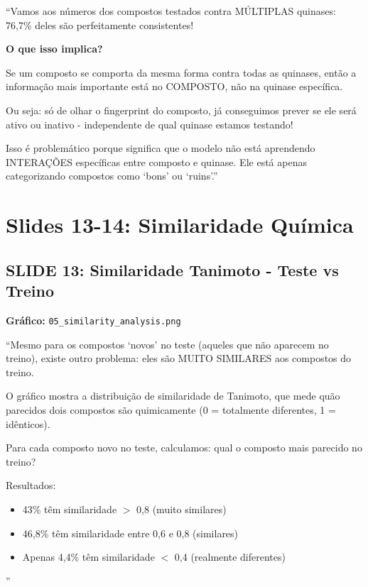 \documentclass[11pt,a4paper]{article}
\begin{document}
\begin{oquedizer}
``Vamos aos números dos compostos testados contra MÚLTIPLAS quinases: 76,7\% deles são perfeitamente consistentes!

\textbf{O que isso implica?}

Se um composto se comporta da mesma forma contra todas as quinases, então a informação mais importante está no COMPOSTO, não na quinase específica.

Ou seja: só de olhar o fingerprint do composto, já conseguimos prever se ele será ativo ou inativo - independente de qual quinase estamos testando!

Isso é problemático porque significa que o modelo não está aprendendo INTERAÇÕES específicas entre composto e quinase. Ele está apenas categorizando compostos como `bons' ou `ruins'.''
\end{oquedizer}

\section{Slides 13-14: Similaridade Química}

\subsection{SLIDE 13: Similaridade Tanimoto - Teste vs Treino}

\textbf{Gráfico:} \texttt{05\_similarity\_analysis.png}

\begin{oquedizer}
``Mesmo para os compostos `novos' no teste (aqueles que não aparecem no treino), existe outro problema: eles são MUITO SIMILARES aos compostos do treino.

O gráfico mostra a distribuição de similaridade de Tanimoto, que mede quão parecidos dois compostos são quimicamente (0 = totalmente diferentes, 1 = idênticos).

Para cada composto novo no teste, calculamos: qual o composto mais parecido no treino?

Resultados:
\begin{itemize}
    \item 43\% têm similaridade $>$ 0,8 (muito similares)
    \item 46,8\% têm similaridade entre 0,6 e 0,8 (similares)
    \item Apenas 4,4\% têm similaridade $<$ 0,4 (realmente diferentes)
\end{itemize}''
\end{oquedizer}
\end{document}
